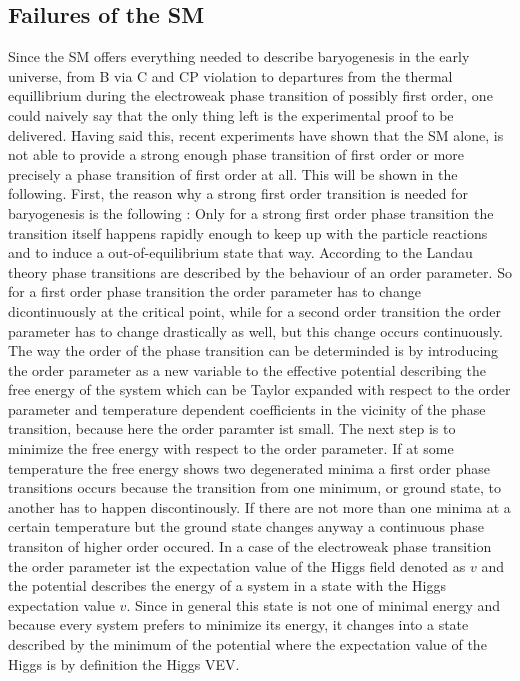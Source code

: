 \subsection{Failures of the SM}
Since the SM offers everything needed to describe baryogenesis in the early universe, from B via C and CP violation to departures from the thermal equillibrium during the electroweak phase transition of possibly first order, one could naively say that the only thing left is the experimental proof to be delivered. \newline\indent
Having said this, recent experiments have shown that the SM alone, is not able to provide a strong enough phase transition of first order or more precisely a phase transition of first order at all. This will be shown in the following. \newline\indent
First, the reason why a strong first order transition is needed for baryogenesis is the following \cite[p. 25]{Bernreuther:2002uj}: Only for a strong first order phase transition the transition itself happens rapidly enough to keep up with the particle reactions and to induce a out-of-equilibrium state that way.\newline\indent
According to the Landau theory phase transitions are described by the behaviour of an order parameter. So for a first order phase transition the order parameter has to change dicontinuously at the critical point, while for a second order transition the order parameter has to change drastically as well, but this change occurs continuously. The way the order of the phase transition can be determinded is by introducing the order parameter as a new variable to the effective potential describing the free energy of the system which can be Taylor expanded with respect to the order parameter and temperature dependent coefficients in the vicinity of the phase transition, because here the order paramter ist small. The next step is to minimize the free energy with respect to the order parameter. If at some temperature the free energy shows two degenerated minima a first order phase transitions occurs because the transition from one minimum, or ground state, to another has to happen discontinously. If there are not more than one minima at a certain temperature but the ground state changes anyway a continuous phase transiton of higher order occured. 
\newline \indent
In a case of the electroweak phase transition the order parameter ist the expectation value of the Higgs field denoted as $v$ and the potential describes the energy of a system in a state with the Higgs expectation value $v$. Since in general this state is not one of minimal energy and because every system prefers to minimize its energy, it changes into a state described by the minimum of the potential where the expectation value of the Higgs is by definition the Higgs VEV. \newline\indent
